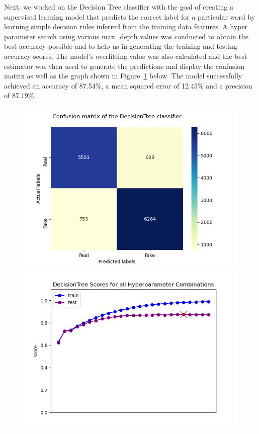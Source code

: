 \documentclass[10pt,twocolumn,letterpaper]{article}
\begin{document}
Next, we worked on the Decision Tree classifier with the goal of creating a supervised learning model that predicts the correct label for a particular word by learning simple decision rules inferred from the training data features. A hyper parameter search using various max\_depth values was conducted to obtain the best accuracy possible and to help us in generating the training and testing accuracy scores. The model's overfitting value was also calculated and the best estimator was then used to generate the predictions and display the confusion matrix as well as the graph shown in Figure~\ref{second_figure} below. The model successfully achieved an accuracy of 87.54\%, a mean squared error of 12.45\% and a precision of 87.19\%.
 
\begin{figure}[h]
   \begin{center}
        \includegraphics[width=\linewidth]{Latex_Report/report/Graphs/DT/confusion_matrix.png}
        \includegraphics[width=\linewidth]{Latex_Report/report/Graphs/DT/scores_plot.png}
   \end{center}
        \vspace*{-8mm}
        \caption{\label{second_figure}}
\end{figure}
\end{document}
